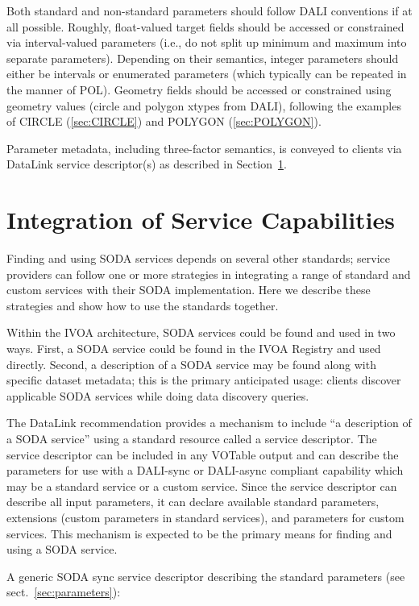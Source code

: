 \documentclass[11pt,a4paper]{ivoa}
\begin{document}
Both standard and non-standard parameters should follow DALI conventions
if at all possible.  Roughly, float-valued target fields should be accessed or
constrained via interval-valued parameters (i.e., do not split up
minimum and maximum into separate parameters).  Depending on their
semantics, integer parameters should either be intervals or enumerated
parameters (which typically can be repeated in the manner of POL). 
Geometry fields should be
accessed or constrained using geometry values (circle and polygon xtypes
from DALI), following the examples of CIRCLE
(\ref{sec:CIRCLE}) and POLYGON (\ref{sec:POLYGON}).

Parameter metadata, including three-factor semantics, is conveyed to
clients via DataLink service descriptor(s) as
described in Section~\ref{sec:integration}.

\section{Integration of Service Capabilities}
\label{sec:integration}

Finding and using SODA services depends on several other standards;
service providers can follow one or more strategies in integrating a
range of standard and custom services with their SODA implementation.
Here we describe these strategies and show how to use the standards
together.

Within the IVOA architecture, SODA services could be found and used in two
ways. First, a SODA service could be found in the IVOA Registry and used
directly. Second, a description of a SODA service may be found along
with specific dataset metadata; this is the primary anticipated usage:
clients discover applicable SODA services while doing data discovery
queries.

The DataLink recommendation provides a mechanism
to include ``a description of a SODA service'' using a standard resource
called a service descriptor. The service descriptor can be included in any
VOTable \citep{std:VOTable} output and can describe the parameters for
use with a DALI-sync or DALI-async compliant capability which may be a standard
 service or a custom service. Since the service descriptor can describe all input parameters,
it can declare available standard parameters, extensions (custom
parameters in standard services), and parameters for custom services.
This mechanism is expected to be the primary means for finding and using
a SODA service. 

A generic SODA sync service descriptor describing the standard
parameters (see sect.~\ref{sec:parameters}):
\end{document}

